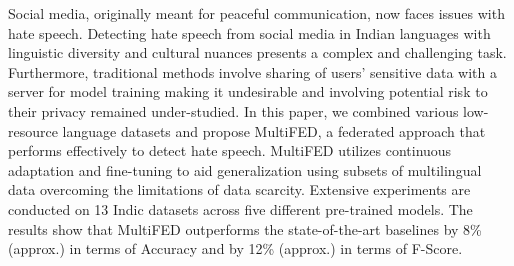 Social media, originally meant for peaceful communication, now faces issues with hate speech. Detecting hate speech from social media in Indian languages with linguistic diversity and cultural nuances presents a complex and challenging task. Furthermore, traditional methods involve sharing of users' sensitive data with a server for model training making it undesirable and involving potential risk to their privacy remained under-studied. In this paper, we combined various low-resource language datasets and propose MultiFED, a federated approach that performs effectively to detect hate speech. MultiFED utilizes continuous adaptation and fine-tuning to aid generalization using subsets of multilingual data overcoming the limitations of data scarcity. Extensive experiments are conducted on 13 Indic datasets across five different pre-trained models. The results show that MultiFED outperforms the state-of-the-art baselines by 8\% (approx.) in terms of Accuracy and by 12\% (approx.) in terms of F-Score.